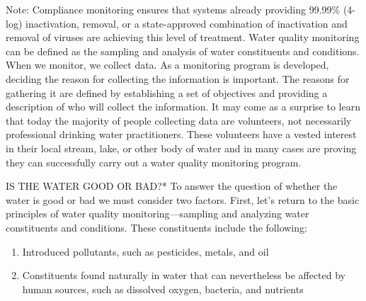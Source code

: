 \documentclass{article}
\begin{document}
Note: Compliance monitoring ensures that systems already providing
99.99\% (4-log) inactivation, removal, or a state-approved combination
of inactivation and removal of viruses are achieving this level of
treatment. Water quality monitoring can be defined as the sampling and
analysis of water constituents and conditions. When we monitor, we
collect data. As a monitoring program is developed, deciding the reason
for collecting the information is important. The reasons for gathering
it are defined by establishing a set of objectives and providing a
description of who will collect the information. It may come as a
surprise to learn that today the majority of people collecting data are
volunteers, not necessarily professional drinking water practitioners.
These volunteers have a vested interest in their local stream, lake, or
other body of water and in many cases are proving they can successfully
carry out a water quality monitoring program.

IS THE WATER GOOD OR BAD?* To answer the question of whether the water
is good or bad we must consider two factors. First, let's return to the
basic principles of water quality monitoring---sampling and analyzing
water constituents and conditions. These constituents include the
following:

\begin{enumerate}
\def\labelenumi{\arabic{enumi}.}
\tightlist
\item
  Introduced pollutants, such as pesticides, metals, and oil
\item
  Constituents found naturally in water that can nevertheless be
  affected by human sources, such as dissolved oxygen, bacteria, and
  nutrients
\end{enumerate}
\end{document}

